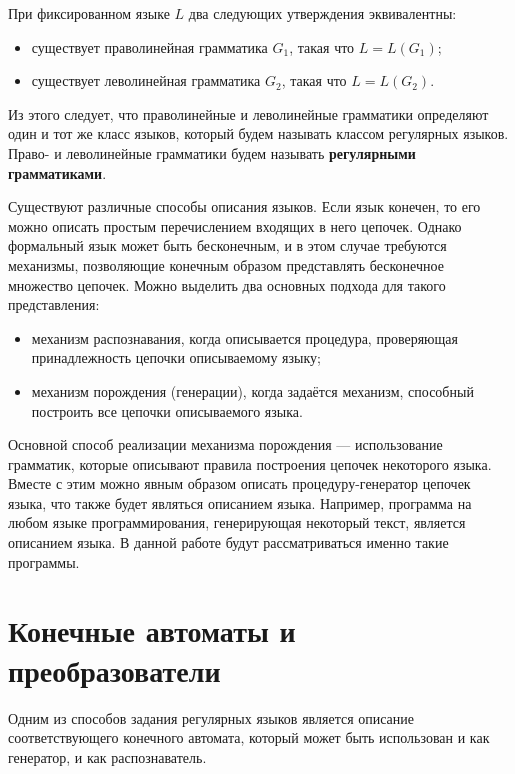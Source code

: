 При фиксированном языке $L$ два следующих утверждения эквивалентны: 
\begin{itemize}
    \item существует праволинейная грамматика $G_1$, такая что $L = L(G_1)$; 
    \item существует леволинейная грамматика $G_2$, такая что $L = L(G_2)$.
\end{itemize}

Из этого следует, что праволинейные и леволинейные грамматики определяют один и тот же класс языков, который будем называть классом регулярных языков. Право- и леволинейные грамматики будем называть \textbf{регулярными грамматиками}. 

    Существуют различные способы описания языков. Если язык конечен, то его можно описать  простым перечислением входящих в него цепочек. Однако формальный язык может быть бесконечным, и в этом случае требуются механизмы, позволяющие конечным образом представлять бесконечное множество цепочек. Можно выделить два основных подхода для такого представления:
\begin{itemize}
    \item механизм распознавания, когда описывается процедура, проверяющая принадлежность цепочки описываемому языку;
    \item механизм порождения (генерации), когда задаётся механизм, способный построить все цепочки описываемого языка.
\end{itemize}

     Основной способ реализации механизма порождения --- использование грамматик, которые описывают правила построения цепочек некоторого языка. Вместе с этим можно явным образом описать процедуру-генератор цепочек языка, что также будет являться описанием языка. Например, программа на любом языке программирования, генерирующая некоторый текст, является описанием языка. В данной работе будут рассматриваться именно такие программы.


\section{Конечные автоматы и преобразователи}

Одним из способов задания регулярных языков является описание соответствующего конечного автомата, который может быть использован и как генератор, и как распознаватель.

